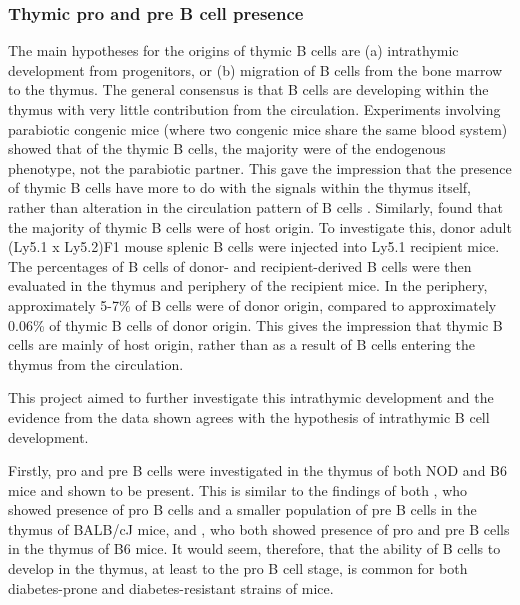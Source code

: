 \subsubsection{Thymic pro and pre B cell presence}
The main hypotheses for the origins of thymic B cells are (a) intrathymic development from progenitors, or (b) migration of B cells from the bone marrow to the thymus.
The general consensus is that B cells are developing within the thymus with very little contribution from the circulation.
Experiments involving parabiotic congenic mice (where two congenic mice share the same blood system) showed that of the thymic B cells, the majority were of the endogenous phenotype, not the parabiotic partner. 
This gave the impression that the presence of thymic B cells have more to do with the signals within the thymus itself, rather than alteration in the circulation pattern of B cells \citep{Perera2013}.
Similarly, \citet{Akashi2000} found that the majority of thymic B cells were of host origin.
To investigate this, donor adult (Ly5.1 x Ly5.2)F1 mouse splenic B cells were injected into Ly5.1 recipient mice.
The percentages of B cells of donor- and recipient-derived B cells were then evaluated in the thymus and periphery of the recipient mice.
In the periphery, approximately 5-7\% of B cells were of donor origin, compared to approximately 0.06\% of thymic B cells of donor origin.
This gives the impression that thymic B cells are mainly of host origin, rather than as a result of B cells entering the thymus from the circulation. 

This project aimed to further investigate this intrathymic development and the evidence from the data shown agrees with the hypothesis of intrathymic B cell development.

Firstly, pro and pre B cells were investigated in the thymus of both NOD and B6 mice and shown to be present. 
This is similar to the findings of both \citet{Hashimoto2002}, who showed presence of pro B cells and a smaller population of pre B cells in the thymus of BALB/cJ mice, and \citet{Akashi2000}, who both showed presence of pro and pre B cells in the thymus of B6 mice.
It would seem, therefore, that the ability of B cells to develop in the thymus, at least to the pro B cell stage, is common for both diabetes-prone and diabetes-resistant strains of mice.

